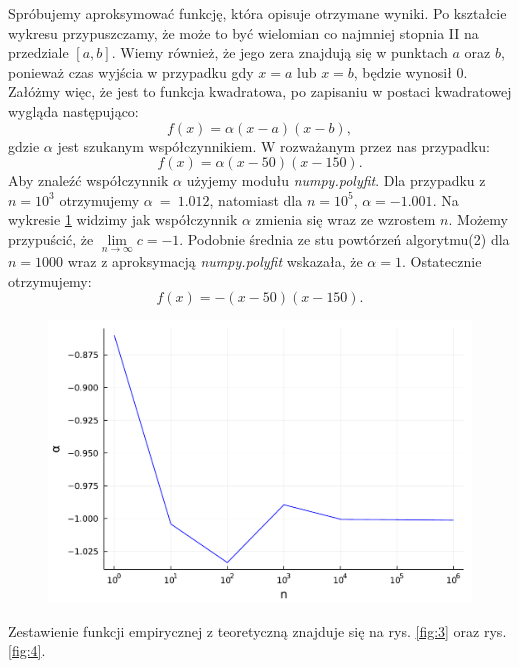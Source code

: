 \documentclass{article}
\theoremstyle{break}
\begin{document}
Spróbujemy aproksymować funkcję, która opisuje otrzymane wyniki. Po kształcie wykresu przypuszczamy, że może to być wielomian co najmniej stopnia II na przedziale $[a,b]$. Wiemy również, że jego zera znajdują się w punktach $a$ oraz $b$, ponieważ czas wyjścia w przypadku gdy $x=a$ lub $x=b$, będzie wynosił 0. Załóżmy więc, że jest to funkcja kwadratowa, po zapisaniu w postaci kwadratowej wygląda następująco:
$$f(x)=\alpha(x-a)(x-b),$$
gdzie $\alpha$ jest szukanym współczynnikiem. W rozważanym przez nas przypadku:
$$f(x)=\alpha(x-50)(x-150).$$
Aby znaleźć współczynnik $\alpha$ użyjemy modułu \textit{numpy.polyfit}. Dla przypadku z $n=10^3$ otrzymujemy $\alpha~=~1.012$, natomiast dla $n=10^5$, $\alpha=-1.001$. Na wykresie \ref{fig:a} widzimy jak współczynnik $\alpha$ zmienia się wraz ze wzrostem $n$. Możemy przypuścić, że $\lim\limits_{n\rightarrow\infty}c=-1$. Podobnie średnia ze stu powtórzeń algorytmu(2) dla $n=1000$ wraz z aproksymacją \textit{numpy.polyfit} wskazała, że $\alpha=1$. Ostatecznie otrzymujemy:
$$f(x)=-(x-50)(x-150).$$
\begin{figure}[H]
	\begin{center}
		\includegraphics[scale=0.30]{alpha.pdf}
		\caption{}
		\label{fig:a}
	\end{center}
\end{figure}
Zestawienie funkcji empirycznej z teoretyczną znajduje się na rys. \ref{fig:3} oraz rys. \ref{fig:4}.
\end{document}
